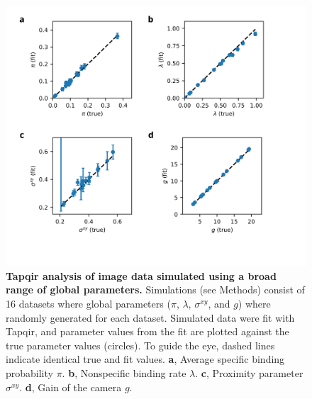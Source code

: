 \begin{figure}[h]
\centering
\includegraphics[width=150mm]{extended-data/figure2/figure2.png}
\caption{\textbf{Tapqir analysis of image data simulated using a broad range of global parameters.} Simulations (see Methods) consist of 16 datasets where global parameters ($\pi$, $\lambda$, $\sigma^{xy}$, and $g$) where randomly generated for each dataset. Simulated data were fit with Tapqir, and parameter values from the fit are plotted against the true parameter values (circles). To guide the eye, dashed lines  indicate identical true and fit values. \textbf{a}, Average specific binding probability $\pi$. \textbf{b}, Nonspecific binding rate $\lambda$. \textbf{c}, Proximity parameter $\sigma^{xy}$. \textbf{d}, Gain of the camera $g$. }
\label{fig:tapqir_global}
\end{figure}
\pagebreak

